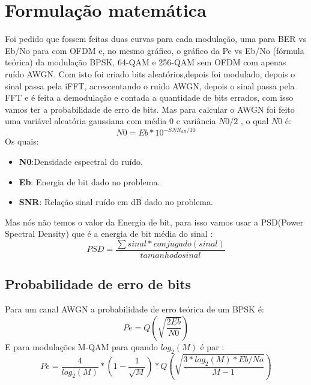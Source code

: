 \documentclass[12pt]{article}
\begin{document}
\section{Formulação matemática} \label{sec:firstpage}
Foi pedido que fossem feitas duas curvas para cada modulação, uma para BER vs Eb/No para com OFDM e, no mesmo gráfico, o gráfico da Pe vs Eb/No (fórmula teórica) da modulação BPSK, 64-QAM e 256-QAM sem OFDM com apenas ruído AWGN. Com isto foi criado bits aleatórios,depois foi modulado, depois o sinal passa pela iFFT, acrescentando o ruido AWGN, depois o sinal passa pela FFT e é feita a demodulação e contada a quantidade de bits errados, com isso vamos ter a probabilidade de erro de bits. Mas para calcular o AWGN foi feito uma variável aleatória gaussiana com média 0 e variância $N0/2$ \cite{Haykin:01}, o qual $N0$ é:
\begin{equation}
    N0= Eb * 10^{-SNR_{dB}/10}
\end{equation}
Os quais:
\begin{itemize}
    \item \textbf{N0}:Densidade espectral do ruído.
    \item \textbf{Eb}: Energia de bit dado no problema.
    \item \textbf{SNR}: Relação sinal ruído em dB dado no problema.
\end{itemize}
Mas nós não temos o valor da Energia de bit, para isso vamos usar a PSD(Power Spectral Density) que é a energia de bit média do sinal \cite{Lathi:2009:MDA:541365}:
\begin{equation}
 PSD=    \frac{\sum sinal*conjugado(sinal)}{tamanhodosinal}
\end{equation}
\subsection{Probabilidade de erro de bits}
Para um canal AWGN a probabilidade de erro teórica de um BPSK \cite{Lathi:2009:MDA:541365} é:
\begin{equation}
    Pe=Q\left(\sqrt{\frac{2Eb}{N0}}\right)  
    
\end{equation}
E para modulações M-QAM para quando $log_{2}(M)$ é par \cite{Lathi:2009:MDA:541365}:
\begin{equation}
    Pe=\frac{4}{log_{2}(M)}*(1-\frac{1}{\sqrt{M}})*Q\left ( \sqrt{\frac{3*log_{2}(M)*Eb/No}{M-1}} \right )

\end{equation}
\end{document}

